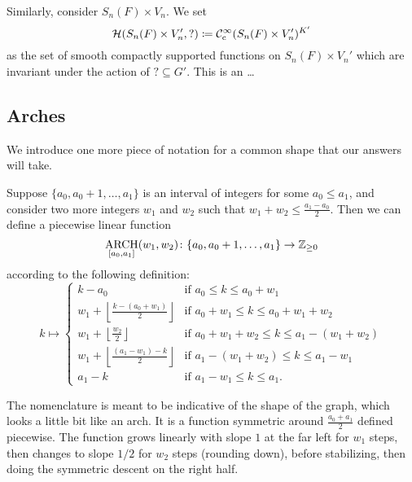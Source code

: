 Similarly, consider $S_n(F) \times V_n$.
We set
\[ \mathcal H(S_n(F) \times V_n', {?}) \coloneqq \mathcal C_{\mathrm{c}}^{\infty}(S_n(F) \times V_n')^{K'} \]
as the set of smooth compactly supported functions on $S_n(F) \times V_n'$
which are invariant under the action of ${?} \subseteq G'$.
This is an \dots

\subsection{Arches}
We introduce one more piece of notation for a common shape that our answers will take.

\begin{definition}
  Suppose $\{a_0, a_0 + 1, \dots, a_1\}$ is an interval of integers for some $a_0 \le a_1$,
  and consider two more integers $w_1$ and $w_2$ such that $w_1 + w_2 \le \frac{a_1-a_0}{2}$.
  Then we can define a piecewise linear function
  \[ \operatorname*{ARCH}_{[a_0, a_1]}(w_1, w_2) \colon \{a_0, a_0+1, \dots, a_1\} \to \mathbb Z_{\ge 0} \]
  according to the following definition:
  \[
    k \mapsto
    \begin{cases}
      k - a_0 & \text{if }a_0 \le k \le a_0 + w_1 \\
      w_1 + \left\lfloor \frac{k-(a_0+w_1)}{2} \right\rfloor & \text{if } a_0 + w_1 \le k \le a_0 + w_1 + w_2 \\
      w_1 + \left\lfloor \frac{w_2}{2} \right\rfloor & \text{if } a_0 + w_1 + w_2 \le k \le a_1 - (w_1 + w_2)\\
      w_1 + \left\lfloor \frac{(a_1-w_1) - k}{2} \right\rfloor & \text{if } a_1 - (w_1 + w_2) \le k \le a_1 - w_1 \\
      a_1 - k & \text{if }a_1 - w_1 \le k \le a_1.
    \end{cases}
  \]
\end{definition}
The nomenclature is meant to be indicative of the shape of the graph,
which looks a little bit like an arch.
It is a function symmetric around $\frac{a_0+a_1}{2}$ defined piecewise.
The function grows linearly with slope $1$ at the far left for $w_1$ steps,
then changes to slope $1/2$ for $w_2$ steps (rounding down),
before stabilizing, then doing the symmetric descent on the right half.

